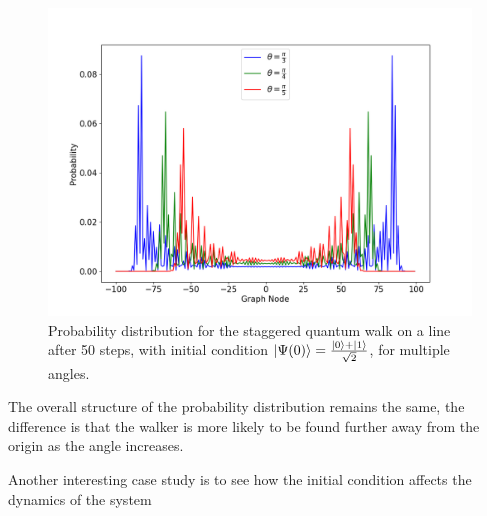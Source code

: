 \documentclass[../../dissertation.tex]{subfiles}
\begin{document}
\begin{figure}[!h]
	\centering
	\includegraphics[scale=0.40]{img/StagQuantumWalk/stagqwMultiple.png}
	\caption{Probability distribution for the staggered quantum walk on a line after 50 steps, with initial condition $\ket{\Psi(0)}=\frac{\ket{0}+\ket{1}}{\sqrt{2}}$, for multiple angles.} 
	\label{fig:stagQWSimulMultTheta}
\end{figure}

The overall structure of the probability distribution remains the same, the difference is that the walker is more likely to be found further away from the origin as the angle increases.\par
Another interesting case study is to see how the initial condition affects the dynamics of the system
\end{document}
